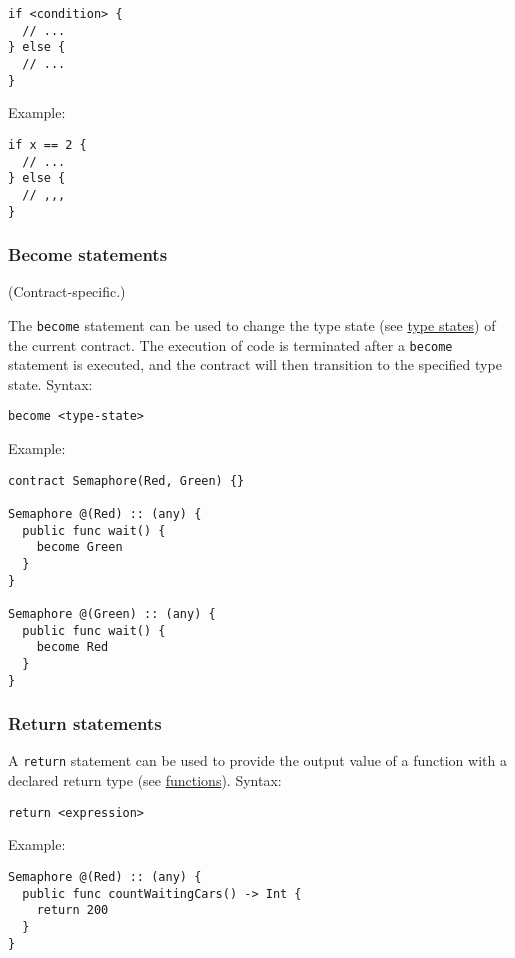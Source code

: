 \begin{verbatim}
if <condition> {
  // ...
} else {
  // ...
}
\end{verbatim}

Example:

\begin{verbatim}
if x == 2 {
  // ...
} else {
  // ,,,
}
\end{verbatim}

\subsubsection{Become statements}
\label{sec:appendix-b-become-statements}

(Contract-specific.)

The \texttt{become} statement can be used to change the type state (see \hyperref[sec:appendix-b-type-states]{type states}) of the current contract. The execution of code is terminated after a \texttt{become} statement is executed, and the contract will then transition to the specified type state. Syntax:

\begin{verbatim}
become <type-state>
\end{verbatim}

Example:

\begin{verbatim}
contract Semaphore(Red, Green) {}

Semaphore @(Red) :: (any) {
  public func wait() {
    become Green
  }
}

Semaphore @(Green) :: (any) {
  public func wait() {
    become Red
  }
}
\end{verbatim}

\subsubsection{Return statements}
\label{sec:appendix-b-return-statements}

A \texttt{return} statement can be used to provide the output value of a function with a declared return type (see \hyperref[sec:appendix-b-functions]{functions}). Syntax:

\begin{verbatim}
return <expression>
\end{verbatim}

Example:

\begin{verbatim}
Semaphore @(Red) :: (any) {
  public func countWaitingCars() -> Int {
    return 200
  }
}
\end{verbatim}

